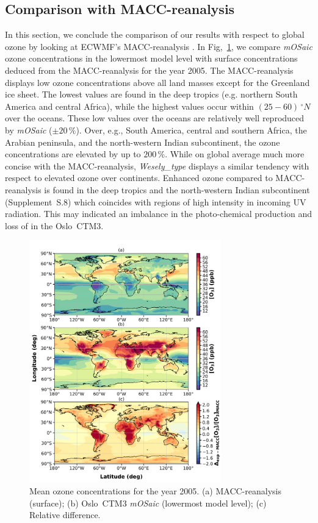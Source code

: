 \documentclass[gmd, manuscript]{copernicus}
\begin{document}
\subsection{Comparison with MACC-reanalysis}
\label{subsec:macc}
In this section, we conclude the comparison of our results with respect to global ozone by looking at ECWMF's MACC-reanalysis \citep[][data obtained from \href{https://apps.ecmwf.int/datasets/data/macc-reanalysis/levtype=ml/}{ECWMF's data center}]{MACC-II}.
In Fig,~\ref{fig:macc_o3conc}, we compare \emph{mOSaic} ozone concentrations in the lowermost model level with surface concentrations deduced from the MACC-reanalysis for the year 2005. The MACC-reanalysis displays low ozone concentrations above all land masses except for the Greenland ice sheet. The lowest values are found in the deep tropics (e.g. northern South America and central Africa), while the highest values occur within $(25-60)\,\unit{^\circ N}$ over the oceans. These low values over the oceans are relatively well reproduced by \emph{mOSaic} ($\pm 20\,\unit{\%}$). Over, e.g., South America, central and southern Africa, the Arabian peninsula, and the north-western Indian subcontinent, the ozone concentrations are elevated by up to $200\,\unit{\%}$. While on global average much more concise with the MACC-reanalysis, \emph{Wesely\_type} displays a similar tendency with respect to elevated ozone over continents. Enhanced ozone compared to MACC-reanalysis is found in the deep tropics and the north-western Indian subcontinent (Supplement~S.8) which coincides with regions of high intensity in incoming UV radiation. This may indicated an imbalance in the photo-chemical production and loss of  in the Oslo~CTM3.

\begin{figure}[t]
  \includegraphics[width=8.3cm]{fig08}
  \caption{Mean ozone concentrations for the year 2005. (a) MACC-reanalysis (surface); (b) Oslo~CTM3 \emph{mOSaic} (lowermost model level); (c) Relative difference.}
  \label{fig:macc_o3conc}
\end{figure}
\end{document}
